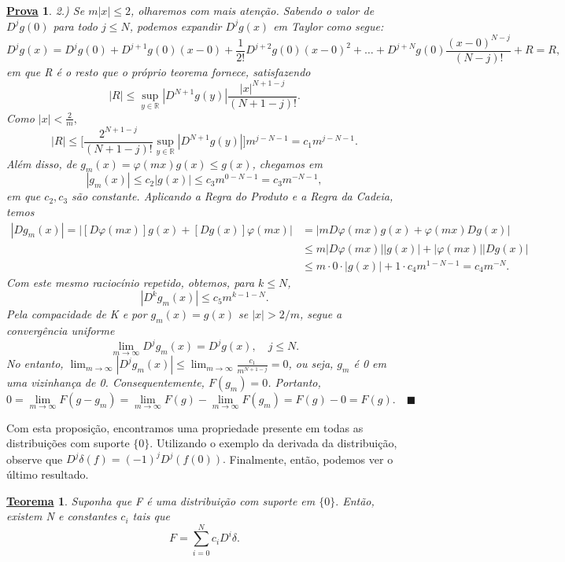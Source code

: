 \documentclass{article}
\newtheorem*{theorem*}{\underline{Teorema}}
\newtheorem*{proof*}{\underline{Prova}}
\renewcommand\qedsymbol{$\blacksquare$}
\begin{document}
\begin{proof*}
     2.) Se \(m|x| \leq 2 \), olharemos com mais atenção. Sabendo o valor de \(D^{j}g(0)\) para todo \(j\leq N\), podemos expandir \(D^{j}g(x)\) em Taylor como segue: 
       \[
         D^{j}g(x) = D^{j}g(0) + D^{j+1}g(0)(x-0) + \frac{1}{2!}D^{j+2}g(0)(x-0)^{2} + \dotsc + D^{j+N}g(0)\frac{(x-0)^{N-j}}{(N-j)!} + R = R,
       \]
      em que R é o resto que o próprio teorema fornece, satisfazendo 
        \[
          |R|\leq \sup_{y\in \mathbb{R}}|D^{N+1}g(y)|\frac{|x|^{N+1-j}}{(N+1-j)!}.
        \]
    Como \(|x| < \frac{2}{m},\) 
      \[
        |R|\leq \biggl[\frac{2^{N+1-j}}{(N+1-j)!}\sup_{y\in \mathbb{R}}|D^{N+1}g(y)|\biggr]m^{j-N-1} = c_{1}m^{j-N-1}.
      \]
    Além disso, de \(g_{m}(x) = \varphi (mx)g(x)\leq g(x)\), chegamos em 
      \[
        |g_{m}(x)|\leq c_{2}|g(x)|\leq c_3m^{0 - N - 1} = c_{3}m^{-N-1},
      \]
    em que \(c_2, c_3\) são constante. Aplicando a Regra do Produto e a Regra da Cadeia, temos 
    \begin{align*}
      |Dg_{m}(x)| = |[D\varphi (mx)]g(x) + [Dg(x)]\varphi (mx)| &= |mD\varphi(mx)g(x) + \varphi (mx)Dg(x)|\\
                                                                &\leq m|D\varphi (mx)||g(x)|+|\varphi (mx)||Dg(x)|\\
                                                                &\leq m \cdot 0 \cdot |g(x)| + 1 \cdot c_4 m^{1-N-1} = c_4m^{-N}.
    \end{align*}
    Com este mesmo raciocínio repetido, obtemos, para \(k\leq N\), 
      \[
        |D^{k}g_m(x)| \leq c_5m^{k-1-N}.
      \]
      Pela compacidade de K e por \(g_m(x) = g(x)\) se \(|x|>2/m\), segue a convergência uniforme 
        \[
          \lim_{m\to \infty}D^{j}g_{m}(x) = D^{j}g(x),\quad j\leq N.
        \]
  No entanto, \(\lim_{m\to \infty}|D^{j}g_{m}(x)|\leq \lim_{m\to \infty}\frac{c_1}{m^{N+1-j}} = 0\), ou seja, \(g_m\) é 0 em uma vizinhança de 0. Consequentemente, \(F(g_m) = 0\). Portanto, 
    \[
      0 = \lim_{m\to \infty}F(g-g_m) = \lim_{m\to \infty}F(g) - \lim_{m\to \infty}F(g_m) = F(g) - 0 = F(g).\quad \text{\qedsymbol}
    \]
\end{proof*}
  Com esta proposição, encontramos uma propriedade presente em todas as distribuições com suporte \(\{0\}.\) Utilizando o exemplo da derivada da distribuição, observe que \(D^{j}\delta (f) = (-1)^{j}D^{j}(f(0)).\)
Finalmente, então, podemos ver o último resultado. 
 \begin{theorem*}
   Suponha que F é uma distribuição com suporte em \(\{0\}.\) Então, existem N e constantes \(c_{i}\) tais que 
     \[
       F = \sum\limits_{i=0}^{N}c_{i}D^{i}\delta .
     \]
 \end{theorem*}
\end{document}
